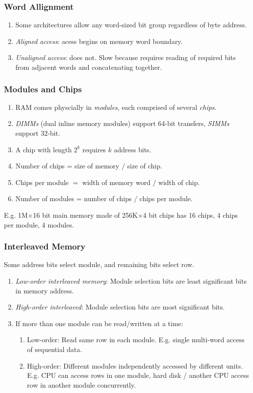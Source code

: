 \documentclass[twocolumn,english]{article}
\begin{document}
\subsubsection{Word Allignment}
\begin{enumerate}
\item Some architectures allow any word-sized bit group regardless of byte
address.
\item \emph{Aligned access}: acess begins on memory word boundary.
\item \emph{Unaligned access}: does not. Slow because requires reading of
required bits from adjacent words and concatenating together.
\end{enumerate}

\subsubsection{Modules and Chips}
\begin{enumerate}
\item RAM comes physcially in \emph{modules}, each comprised of several
\emph{chips}.
\item \emph{DIMMs} (dual inline memory modules) support 64-bit transfers,
\emph{SIMMs} support 32-bit.
\item A chip with length $2^{k}$ requires $k$ address bits.
\item Number of chips = size of memory $/$ size of chip.
\item Chips per module $=$ width of memory word $/$ width of chip.
\item Number of modules = number of chips $/$ chips per module.
\end{enumerate}
E.g. 1M$\times$16 bit main memory made of 256K$\times$4 bit chips
has 16 chips, 4 chips per module, 4 modules.


\subsubsection{Interleaved Memory}

Some address bits select module, and remaining bits select row.
\begin{enumerate}
\item \emph{Low-order interleaved memory}: Module selection bits are least
significant bits in memory address.
\item \emph{High-order interleaved}: Module selection bits are most significant
bits.
\item If more than one module can be read/written at a time:

\begin{enumerate}
\item Low-order: Read same row in each module. E.g. single multi-word access
of sequential data.
\item High-order: Different modules independently accessed by different units.
E.g. CPU can access rows in one module, hard disk / another CPU access
row in another module concurrently.
\end{enumerate}
\end{enumerate}
\end{document}
